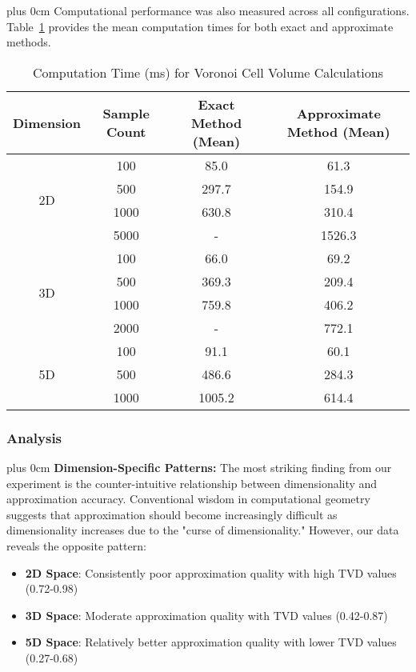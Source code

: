 \documentclass[11pt,a4paper]{article}
\newcommand{\justifytext}{\leftskip=0pt \rightskip=0pt plus 0cm}
\begin{document}
\justifytext
Computational performance was also measured across all configurations. Table~\ref{table:voronoi-performance} provides the mean computation times for both exact and approximate methods.

\begin{table}[h]
\centering
\caption{Computation Time (ms) for Voronoi Cell Volume Calculations}
\label{table:voronoi-performance}
\begin{tabular}{|c|c|c|c|}
\hline
\textbf{Dimension} & \textbf{Sample Count} & \textbf{Exact Method (Mean)} & \textbf{Approximate Method (Mean)} \\
\hline
\multirow{4}{*}{2D} & 100 & 85.0 & 61.3 \\
 & 500 & 297.7 & 154.9 \\
 & 1000 & 630.8 & 310.4 \\
 & 5000 & - & 1526.3 \\
\hline
\multirow{4}{*}{3D} & 100 & 66.0 & 69.2 \\
 & 500 & 369.3 & 209.4 \\
 & 1000 & 759.8 & 406.2 \\
 & 2000 & - & 772.1 \\
\hline
\multirow{3}{*}{5D} & 100 & 91.1 & 60.1 \\
 & 500 & 486.6 & 284.3 \\
 & 1000 & 1005.2 & 614.4 \\
\hline
\end{tabular}
\end{table}

\subsubsection{Analysis}

\justifytext
\textbf{Dimension-Specific Patterns:} The most striking finding from our experiment is the counter-intuitive relationship between dimensionality and approximation accuracy. Conventional wisdom in computational geometry suggests that approximation should become increasingly difficult as dimensionality increases due to the "curse of dimensionality." However, our data reveals the opposite pattern:

\begin{itemize}
    \item \textbf{2D Space}: Consistently poor approximation quality with high TVD values (0.72-0.98)
    \item \textbf{3D Space}: Moderate approximation quality with TVD values (0.42-0.87)
    \item \textbf{5D Space}: Relatively better approximation quality with lower TVD values (0.27-0.68)
\end{itemize}
\end{document}

